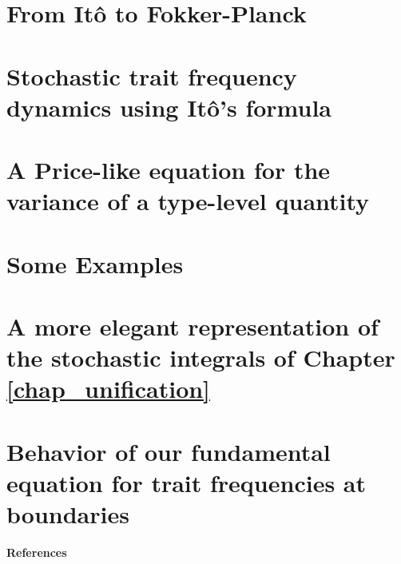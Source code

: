 \documentclass[twoside,12pt]{iiser-thesis-modified} %
\begin{document}
\cleardoublepage
{}
\appendix
{}

\renewcommand{\chaptername}{Appendix}

\fancyhead[CO]{  \rule[-4ex]{0pt}{4ex}\footnotesize\itshape{\chaptername~\thechapter: \nouppercase{\leftmark}}}


\chapter{From It\^{o} to Fokker-Planck}\label{App_SDE_FPE}

\chapter{Stochastic trait frequency dynamics using It\^{o}'s formula}\label{App_density_to_freq}

\chapter{A Price-like equation for the variance of a type-level quantity}\label{App_stoch_var_eqns}

\chapter{Some Examples}\label{App_examples}

\chapter{A more elegant representation of the stochastic integrals of Chapter \ref{chap_unification}}\label{App_alternative_representation}

\chapter{Behavior of our fundamental equation for trait frequencies at boundaries}\label{App_well_behaved}



\cleardoublepage
{}
\cleardoublepage
{}
\vspace*{1.3cm}
{\noindent\fontsize{48}{60}\selectfont \textbf{References}}
\renewcommand*{\bibfont}{\footnotesize}	
\begingroup
\RaggedRight
\vspace{5ex}
\printbibliography[heading=none]
\endgroup
\end{document}
